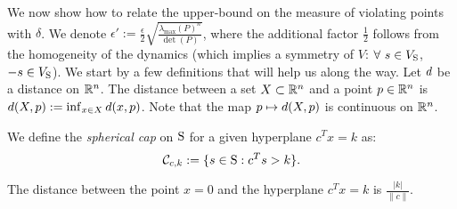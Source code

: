 We now show how to relate the upper-bound on the measure of violating points with $\delta$. We denote $\epsilon':=\frac{\epsilon}{2} \sqrt{\frac{\lambda_{\max}(P)^n}{\det(P)}}$, where the additional factor $\frac{1}{2}$ follows from the homogeneity of the dynamics (which implies a symmetry of $V$: $\forall\ s \in V_{\text{S}}$, $-s \in V_{\text{S}}$). We start by a few definitions that will help us along the way. Let $d$ be a distance on $\mathbb{R}^n$. The distance between a set $X \subset \mathbb{R}^n$ and a point $p \in \mathbb{R}^n$ is $d(X, p):=\inf_{x \in X}d(x,p)$. Note that the map $p \mapsto d(X,p)$ is continuous on $\mathbb{R}^n$.

\begin{definition}%
We define the \emph{spherical cap} on $\text{S}$ for a given hyperplane $c^Tx = k$ as:
\begin{equation*}\mathcal{C}_{c,k} := \{s \in \text{S} : c^Ts >k\}.\end{equation*}
\end{definition}





\begin{proposition}\label{prop:distance}The distance between the point $x=0$ and the hyperplane $c^Tx = k$ is $\frac{|k|}{\|c\|}$.
\end{proposition}

